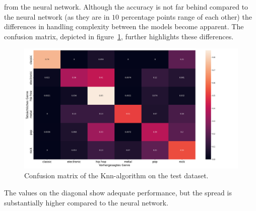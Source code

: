 \documentclass[
  12pt,
  bibliography=totoc,     %
  captions=tableheading,  %
  titlepage=firstiscover, %
]{scrartcl}
\begin{document}
from the neural network. Although the accuracy is not far behind compared to the neural network (as they are in $\num{10}$ percentage points range of each other) the
differences in handling complexity between the models become apparent.
The confusion matrix, depicted in figure~\ref{fig:conf_knn}, further highlights these differences.
\begin{figure}[H]
  \centering
  \includegraphics[scale=0.33]{figures/knn/confusion_matrix_knn.png}
  \caption{Confusion matrix of the Knn-algorithm on the test dataset.}
  \label{fig:conf_knn}
\end{figure}
\noindent
The values on the diagonal show adequate performance, but the spread is substantially higher compared to the neural network.
\end{document}
